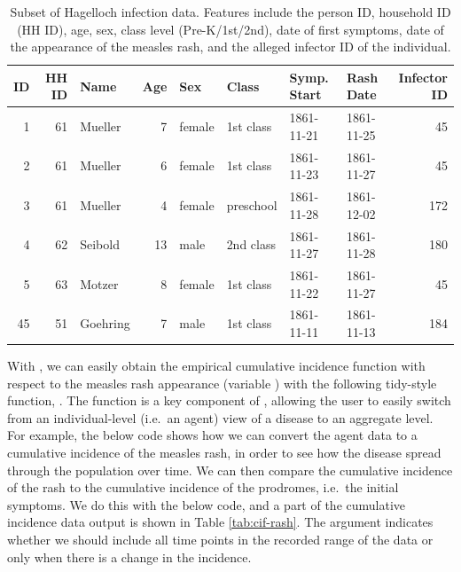 \documentclass[
  shortnames]{jss}
\begin{document}
\begin{CodeChunk}
\begin{table}[!h]

\caption{\label{tab:hags-people}Subset of Hagelloch infection data.  Features include the person ID, household ID (HH ID), age, sex, class level (Pre-K/1st/2nd), date of first symptoms, date of the appearance of the measles rash, and the alleged infector ID of the individual.}
\centering
\begin{tabular}[t]{rrlrllllr}
\toprule
ID & HH ID & Name & Age & Sex & Class & Symp. Start & Rash Date & Infector ID\\
\midrule
1 & 61 & Mueller & 7 & female & 1st class & 1861-11-21 & 1861-11-25 & 45\\
2 & 61 & Mueller & 6 & female & 1st class & 1861-11-23 & 1861-11-27 & 45\\
3 & 61 & Mueller & 4 & female & preschool & 1861-11-28 & 1861-12-02 & 172\\
4 & 62 & Seibold & 13 & male & 2nd class & 1861-11-27 & 1861-11-28 & 180\\
5 & 63 & Motzer & 8 & female & 1st class & 1861-11-22 & 1861-11-27 & 45\\
45 & 51 & Goehring & 7 & male & 1st class & 1861-11-11 & 1861-11-13 & 184\\
\bottomrule
\end{tabular}
\end{table}

\end{CodeChunk}

With , we can easily obtain the empirical cumulative
incidence function with respect to the measles rash appearance (variable
) with the following tidy-style function,
. The function 
is a key component of , allowing the user to easily
switch from an individual-level (i.e.~an agent) view of a disease to an
aggregate level. For example, the below code shows how we can convert
the agent data to a cumulative incidence of the measles rash, in order
to see how the disease spread through the population over time. We can
then compare the cumulative incidence of the rash to the cumulative
incidence of the prodromes, i.e.~the initial symptoms. We do this with
the below code, and a part of the cumulative incidence data output is
shown in Table \ref{tab:cif-rash}. The argument
 indicates whether we should include all
time points in the recorded range of the data or only when there is a
change in the incidence.
\end{document}
